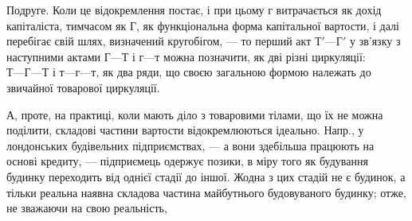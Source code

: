 Подруге. Коли це відокремлення постає, і при цьому $г$ витрачається
як дохід капіталіста, тимчасом як $Г$, як функціональна форма капітальної
вартости, і далі перебігає свій шлях, визначений кругобігом, — то перший
акт $Т' — Г'$ у зв’язку з наступними актами $Г — Т$ і $г — т$ можна позначити,
як дві різні циркуляції: $Т — Г — Т$ і $т — г — т$, як два ряди, що своєю
загальною формою належать до звичайної товарової циркуляції.

А, проте, на практиці, коли мають діло з товаровими тілами, що
їх не можна поділити, складові частини вартости відокремлюються
ідеально. Напр., у лондонських будівельних підприємствах, — а вони здебільша
працюють на основі кредиту, — підприємець одержує позики,
в міру того як будування будинку переходить від однієї стадії до іншої.
Жодна з цих стадій не є будинок, а тільки реальна наявна складова частина
майбутнього будовуваного будинку; отже, не зважаючи на свою реальність,
\parbreak{}  %
